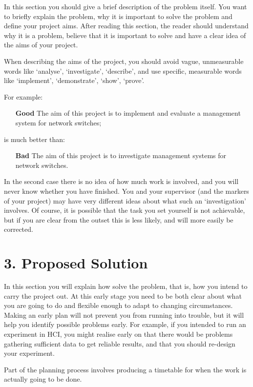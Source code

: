 \documentclass[11pt, a4paper, twoside, openright]{report}
\begin{document}
In this section you should give a brief description of the problem itself. You want to briefly explain the problem, why it is important to solve the problem and define your project aims. After reading this section, the reader should understand why it is a problem, believe that it is important to solve and have a clear idea of the aims of your project.

When describing the aims of the project, you should avoid vague, unmeasurable words like `analyse', `investigate', `describe', and use specific, measurable words like `implement', `demonstrate', `show', `prove'.

For example:

\begin{itemize}
  \item[\bf Good] The aim of this project is to implement and evaluate a management system for network switches;
\end{itemize}
is much better than:
\begin{itemize}
  \item[\bf Bad] The aim of this project is to investigate management systems for network switches.
\end{itemize}

In the second case there is no idea of how much work is involved, and you will never know whether you have finished. You and your supervisor (and the markers of your project) may have very different ideas about what such an `investigation' involves. Of course, it is possible that the task you set yourself is not achievable, but if you are clear from the outset this is less likely, and will more easily be corrected.

\section*{3. Proposed Solution}

In this section you will explain how solve the problem, that is, how you intend to carry the project out. At this early stage you need to be both clear about what you are going to do and flexible enough to adapt to changing circumstances. Making an early plan will not prevent you from running into trouble, but it will help you identify possible problems early. For example, if you intended to run an experiment in HCI, you might realise early on that there would be problems gathering sufficient data to get reliable results, and that you should re-design your experiment.

Part of the planning process involves producing a timetable for when the work is actually going to be done.
\end{document}
